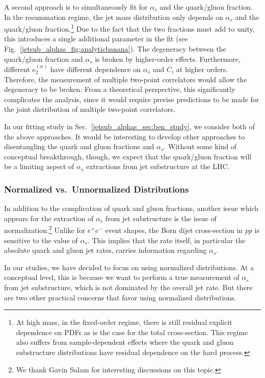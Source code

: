 \documentclass[11pt]{cernrep}
\begin{document}
A second approach is to simultaneously fit for $\alpha_s$ and the quark/gluon fraction.
%
In the resummation regime, the jet mass distribution only depends on $\alpha_s$ and the quark/gluon fraction.\footnote{At high mass, in the fixed-order regime, there is still residual explicit dependence on PDFs as is the case for the total cross-section.  This regime also suffers from sample-dependent effects where the quark and gluon substructure distributions have residual dependence on the hard process.}
%
Due to the fact that the two fractions must add to unity, this introduces a single additional parameter in the fit (see Fig.~\ref{jetsub_alphas_fig:analyticbanana}).
%
The degeneracy between the quark/gluon fraction and $\alpha_s$ is broken by higher-order effects.
%
Furthermore, different $e_2^{(\alpha)}$ have different dependence on $\alpha_s$ and $C_i$ at higher orders.
%
Therefore, the measurement of multiple two-point correlators would allow the degeneracy to be broken.
%
From a theoretical perspective, this significantly complicates the analysis, since it would require precise
predictions to be made for the joint distribution of multiple two-point correlators.


In our fitting study in Sec.~\ref{jetsub_alphas_sec:ben_study}, we consider both of the above approaches.
%
It would be interesting to develop other approaches to disentangling the quark and gluon fractions and $\alpha_s$.
%
Without some kind of conceptual breakthrough, though, we expect that the quark/gluon fraction will be a limiting aspect of $\alpha_s$ extractions from jet substructure at the LHC.

\subsubsection{Normalized vs.\ Unnormalized Distributions}
\label{subjetsub_alphas_sec:norm}

In addition to the complication of quark and gluon fractions, another issue which appears for the extraction of $\alpha_s$ from jet substructure is the issue of normalization.\footnote{We thank Gavin Salam for interesting discussions on this topic. }
%
Unlike for $e^+e^-$ event shapes, the Born dijet cross-section in $pp$ is sensitive to the value of $\alpha_s$.
%
This implies that the rate itself, in particular the absolute quark and gluon jet rates, carries information regarding $\alpha_s$. 

In our studies, we have decided to focus on using normalized distributions.
%
At a conceptual level, this is because we want to perform a true measurement of $\alpha_s$ from jet substructure, which is not dominated by the overall jet rate.
%
But there are two other practical concerns that favor using normalized distributions.
\end{document}
